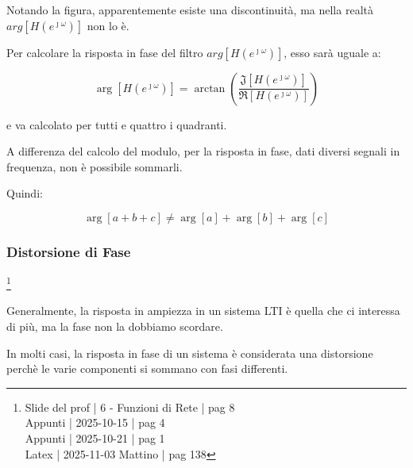 Notando la figura, apparentemente esiste una discontinuità, ma nella realtà $arg \left[ H \left( e^{\jmath \omega}\right)\right]$ non lo è. \newline 

Per calcolare la risposta in fase del filtro $arg \left[ H \left( e^{\jmath \omega}\right)\right]$, 
esso sarà uguale a: 

{
    \Large 
    \begin{equation}
        \arg \left[ H \left( e^{\jmath \omega}\right)\right] 
        = 
        \arctan \left( \dfrac{\mathfrak{J} \left[ H \left( e^{\jmath \omega}\right)\right]}{\Re \left[ H \left( e^{\jmath \omega}\right)\right]}\right)
    \end{equation}
}

e va calcolato per tutti e quattro i quadranti. \newline 

A differenza del calcolo del modulo, per la risposta in fase, dati diversi segnali in frequenza, 
non è possibile sommarli. \newline 

Quindi: 

{
    \Large 
    \begin{equation}
        \arg \left[ a + b + c\right]
        \neq 
        \arg[a] 
        + 
        \arg[b] 
        + 
        \arg[c] 
    \end{equation}
}

\newpage 

\subsubsection{Distorsione di Fase} \label{subsubsec: Distorsione di Fase}

\footnote{ 
    Slide del prof | 6 - Funzioni di Rete | pag 8\\
    Appunti | 2025-10-15 | pag 4  \\ 
    Appunti | 2025-10-21 | pag 1 \\ 
    Latex | 2025-11-03 Mattino | pag 138
}

\begin{tcolorbox}
Generalmente, la risposta in ampiezza in un sistema LTI è quella che ci interessa di più, 
ma la fase non la dobbiamo scordare.     
\end{tcolorbox}

In molti casi, la risposta in fase di un sistema è considerata una distorsione perchè le varie componenti si sommano con fasi differenti. \newline 

